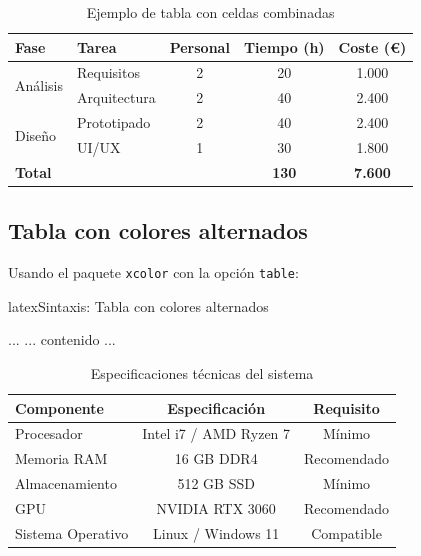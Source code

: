 \begin{table}[htbp]
  \centering
  \caption{Ejemplo de tabla con celdas combinadas}
  \label{tab:multicolrow}
  \EPScabeceraTabla
  \begin{tabular}{llccc}
    \toprule
    \textbf{Fase} & \textbf{Tarea} & \textbf{Personal} & \textbf{Tiempo (h)} & \textbf{Coste (€)} \\
    \midrule
    \multirow{2}{*}{Análisis} & Requisitos   & 2 & 20 & 1.000 \\
                              & Arquitectura & 2 & 40 & 2.400 \\
    \midrule
    \multirow{2}{*}{Diseño}   & Prototipado  & 2 & 40 & 2.400 \\
                              & UI/UX        & 1 & 30 & 1.800 \\
    \midrule
    \multicolumn{3}{l}{\textbf{Total}} & \textbf{130} & \textbf{7.600} \\
    \bottomrule
  \end{tabular}
\end{table}

\subsection{Tabla con colores alternados}
\label{subsec:tabla-colores-alternados}

Usando el paquete \texttt{xcolor} con la opción \texttt{table}:

\begin{codigosimple}{latex}{Sintaxis: Tabla con colores alternados}
\begin{tabular}{...}
  ... contenido ...
\end{tabular}
\end{codigosimple}

\begin{table}[htbp]
  \centering
  \caption{Especificaciones técnicas del sistema}
  \label{tab:specs}
  \EPScabeceraTabla
  \begin{tabular}{@{}lcc@{}}
    \toprule
    \textbf{Componente} & \textbf{Especificación} & \textbf{Requisito} \\
    \midrule
    Procesador & Intel i7 / AMD Ryzen 7 & Mínimo \\
    Memoria RAM & 16 GB DDR4 & Recomendado \\
    Almacenamiento & 512 GB SSD & Mínimo \\
    GPU & NVIDIA RTX 3060 & Recomendado \\
    Sistema Operativo & Linux / Windows 11 & Compatible \\
    \bottomrule
  \end{tabular}
\end{table}



